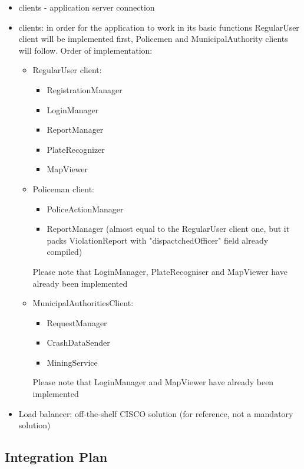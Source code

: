 \begin{itemize}
	\item clients - application server connection
	\item clients: in order for the application to work in its basic functions RegularUser client will be implemented first, Policemen and MunicipalAuthority clients will follow.\newline
	Order of implementation:
		\begin{itemize}
			\item RegularUser client:
			\begin{itemize}
				\item RegistrationManager
				\item LoginManager
				\item ReportManager
				\item PlateRecognizer
				\item MapViewer
			\end{itemize}
			\newpage
			\item Policeman client:
			\begin{itemize}
				\item PoliceActionManager 
				\item ReportManager (almost equal to the RegularUser client one, but it packs ViolationReport with "dispactchedOfficer" field already compiled)
			\end{itemize}
			Please note that LoginManager, PlateRecogniser and MapViewer have already been implemented
			\item MunicipalAuthoritiesClient:
				\begin{itemize}
					\item RequestManager
					\item CrashDataSender
					\item MiningService
				\end{itemize}
			Please note that LoginManager and MapViewer have already been implemented 
			\end{itemize}
	\item Load balancer: off-the-shelf CISCO solution (for reference, not a mandatory solution)
	\end{itemize} 

\subsection{Integration Plan}
